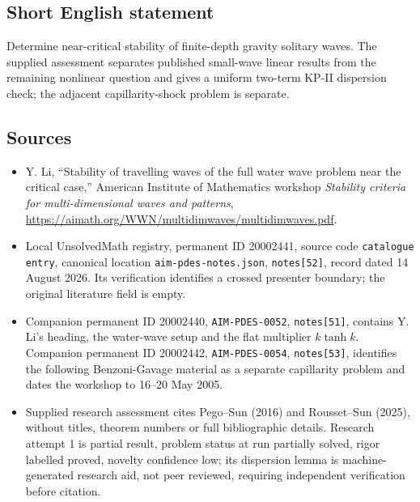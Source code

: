 \documentclass[11pt]{article}
\begin{document}
\subsection{Short English statement}
Determine near-critical stability of finite-depth gravity solitary waves. The supplied assessment separates published small-wave linear results from the remaining nonlinear question and gives a uniform two-term KP-II dispersion check; the adjacent capillarity-shock problem is separate.
\subsection{Sources}
\begin{itemize}
\item Y. Li, ``Stability of travelling waves of the full water wave problem near the critical case,'' American Institute of Mathematics workshop \emph{Stability criteria for multi-dimensional waves and patterns}, \url{https://aimath.org/WWN/multidimwaves/multidimwaves.pdf}.
\item Local UnsolvedMath registry, permanent ID 20002441, source code \texttt{catalogue entry}, canonical location \texttt{aim-pdes-notes.json}, \texttt{notes[52]}, record dated 14 August 2026. Its verification identifies a crossed presenter boundary; the original literature field is empty.
\item Companion permanent ID 20002440, \texttt{AIM-PDES-0052}, \texttt{notes[51]}, contains Y. Li's heading, the water-wave setup and the flat multiplier $k\tanh k$. Companion permanent ID 20002442, \texttt{AIM-PDES-0054}, \texttt{notes[53]}, identifies the following Benzoni-Gavage material as a separate capillarity problem and dates the workshop to 16--20 May 2005.
\item Supplied research assessment cites Pego--Sun (2016) and Rousset--Sun (2025), without titles, theorem numbers or full bibliographic details. Research attempt 1 is partial result, problem status at run partially solved, rigor labelled proved, novelty confidence low; its dispersion lemma is machine-generated research aid, not peer reviewed, requiring independent verification before citation.
\end{itemize}
\end{document}
